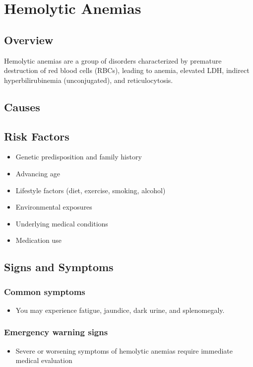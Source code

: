 \chapter{Hemolytic Anemias}
\label{sec:Hemolytic Anemias}

\section{Overview}
Hemolytic anemias are a group of disorders characterized by premature destruction of red blood cells (RBCs), leading to anemia, elevated LDH, indirect hyperbilirubinemia (unconjugated), and reticulocytosis.
\section{Causes}
\section{Risk Factors}

\begin{itemize}[noitemsep]
  \item Genetic predisposition and family history
  \item Advancing age
  \item Lifestyle factors (diet, exercise, smoking, alcohol)
  \item Environmental exposures
  \item Underlying medical conditions
  \item Medication use
\end{itemize}
\section{Signs and Symptoms}

\subsection{Common symptoms}
\begin{itemize}[noitemsep]
  \item You may experience fatigue, jaundice, dark urine, and splenomegaly. 
  \end{itemize}

\subsection{Emergency warning signs}
\begin{itemize}[noitemsep]
  \item Severe or worsening symptoms of hemolytic anemias require immediate medical evaluation
\end{itemize}
